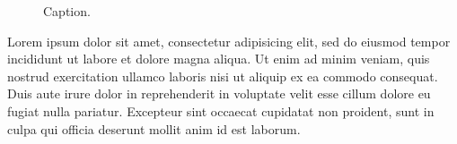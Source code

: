 \documentclass{sig-alternate}
\theoremstyle{definition}
\theoremstyle{theorem}
\theoremstyle{corollary}
\begin{document}
\begin{figure}[!htbp]
\center
\caption{Caption.}
\label{fig:media_trend}
\end{figure}

Lorem ipsum dolor sit amet, consectetur adipisicing elit, sed do eiusmod
tempor incididunt ut labore et dolore magna aliqua. Ut enim ad minim veniam,
quis nostrud exercitation ullamco laboris nisi ut aliquip ex ea commodo
consequat. Duis aute irure dolor in reprehenderit in voluptate velit esse
cillum dolore eu fugiat nulla pariatur. Excepteur sint occaecat cupidatat non
proident, sunt in culpa qui officia deserunt mollit anim id est laborum.


%
\newpage


%
%


\end{document}
